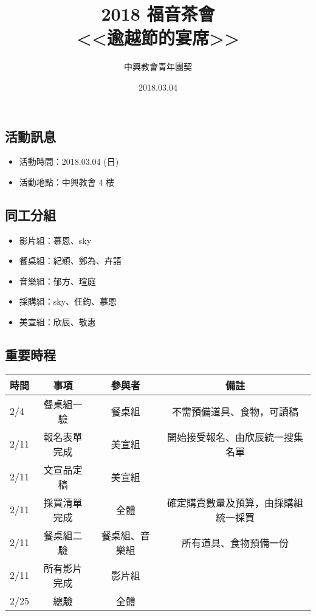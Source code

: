 \documentclass[titlepage, 12pt]{article}
\begin{document}
\begin{CJK}{UTF8}{bkai}
  \renewcommand{\contentsname}{目錄}
  \renewcommand{\listfigurename}{圖目錄}
  \renewcommand{\listtablename}{表目錄}
  \renewcommand{\refname}{參考文獻}
  \renewcommand{\abstractname}{摘要}
  \renewcommand{\indexname}{索引}
  \renewcommand{\tablename}{表}
  \renewcommand{\figurename}{圖}
  \renewcommand{\today}{\number\year ~年~ \number\month ~月~ \number\day ~日}
\title{2018 福音茶會 \\ <<逾越節的宴席>>}
\author{中興教會青年團契}
\date{2018.03.04}
\maketitle


\section*{活動訊息}
\begin{itemize}
  \item 活動時間：2018.03.04 (日)
  \item 活動地點：中興教會 4 樓
\end{itemize}


\subsection*{同工分組}
\begin{itemize}
  \item 影片組：慕恩、sky
  \item 餐桌組：紀穎、鄭為、卉語
  \item 音樂組：郁方、瑄庭
  \item 採購組：sky、任鈞、慕恩
  \item 美宣組：欣辰、敬惠
\end{itemize}


\subsection*{重要時程}
\begin{center}
  \begin{tabular}{lccc}
    \hline
      時間 & 事項 & 參與者 & 備註 \\
      \hline
      2/4  & 餐桌組一驗 & 餐桌組 & 不需預備道具、食物，可讀稿 \\
      2/11 & 報名表單完成 & 美宣組 & 開始接受報名、由欣辰統一搜集名單 \\
      2/11 & 文宣品定稿 & 美宣組 & \\
      2/11 & 採買清單完成 & 全體 & 確定購賣數量及預算，由採購組統一採買 \\
      2/11 & 餐桌組二驗 & 餐桌組、音樂組 & 所有道具、食物預備一份 \\
      2/11 & 所有影片完成 & 影片組 & \\
      2/25 & 總驗 & 全體 & \\
      \hline
  \end{tabular}
\end{center}



\end{CJK}
\end{document}
